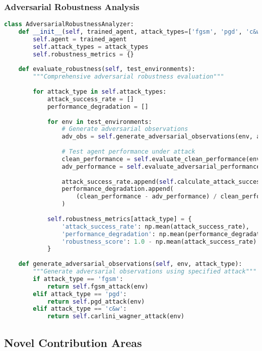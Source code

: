 \documentclass[12pt,a4paper]{article}
\begin{document}
\subsubsection{Adversarial Robustness Analysis}
\begin{lstlisting}[language=Python, caption=Adversarial Robustness Framework]
class AdversarialRobustnessAnalyzer:
    def __init__(self, trained_agent, attack_types=['fgsm', 'pgd', 'c&w']):
        self.agent = trained_agent
        self.attack_types = attack_types
        self.robustness_metrics = {}
    
    def evaluate_robustness(self, test_environments):
        """Comprehensive adversarial robustness evaluation"""
        
        for attack_type in self.attack_types:
            attack_success_rate = []
            performance_degradation = []
            
            for env in test_environments:
                # Generate adversarial observations
                adv_obs = self.generate_adversarial_observations(env, attack_type)
                
                # Test agent performance under attack
                clean_performance = self.evaluate_clean_performance(env)
                adv_performance = self.evaluate_adversarial_performance(env, adv_obs)
                
                attack_success_rate.append(self.calculate_attack_success(adv_performance))
                performance_degradation.append(
                    (clean_performance - adv_performance) / clean_performance
                )
            
            self.robustness_metrics[attack_type] = {
                'attack_success_rate': np.mean(attack_success_rate),
                'performance_degradation': np.mean(performance_degradation),
                'robustness_score': 1.0 - np.mean(attack_success_rate)
            }
    
    def generate_adversarial_observations(self, env, attack_type):
        """Generate adversarial observations using specified attack"""
        if attack_type == 'fgsm':
            return self.fgsm_attack(env)
        elif attack_type == 'pgd':
            return self.pgd_attack(env)
        elif attack_type == 'c&w':
            return self.carlini_wagner_attack(env)
\end{lstlisting}

\subsection{Novel Contribution Areas}
\end{document}

